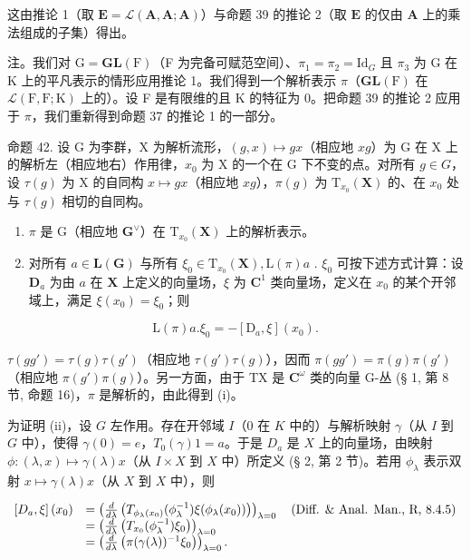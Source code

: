 这由推论 1（取 \(\mathbf{E} = \mathcal{L}(\mathbf{A},\mathbf{A};\mathbf{A})\)）与命题 39 的推论 2（取 \(\mathbf{E}\) 的仅由 \(\mathbf{A}\) 上的乘法组成的子集）得出。

注。我们对 \(\mathrm{G} = \mathbf{GL}(\mathrm{F})\)（F 为完备可赋范空间）、\(\pi_1 = \pi_2 = \mathrm{Id}_{G}\) 且 \(\pi_3\) 为 G 在 K 上的平凡表示的情形应用推论 1。我们得到一个解析表示 \(\pi\)（\(\mathbf{GL}(\mathrm{F})\) 在 \(\mathcal{L}(\mathrm{F},\mathrm{F};\mathrm{K})\) 上的）。设 F 是有限维的且 K 的特征为 0。把命题 39 的推论 2 应用于 \(\pi\)，我们重新得到命题 37 的推论 1 的一部分。

命题 42. 设 G 为李群，X 为解析流形，\((g,x)\mapsto gx\)（相应地 \(xg\)）为 G 在 X 上的解析左（相应地右）作用律，\(x_0\) 为 X 的一个在 G 下不变的点。对所有 \(g\in G\)，设 \(\tau (g)\) 为 X 的自同构 \(x\mapsto gx\)（相应地 \(xg\)），\(\pi (g)\) 为 \(\mathrm{T}_{x_0}(\mathbf{X})\) 的、在 \(x_0\) 处与 \(\tau (g)\) 相切的自同构。

\begin{enumerate}
\def\labelenumi{(\roman{enumi})}
\item
  \(\pi\) 是 G（相应地 \(\mathbf{G}^{\vee}\)）在 \(\mathrm{T}_{x_0}(\mathbf{X})\) 上的解析表示。
\item
  对所有 \(a \in \mathbf{L}(\mathbf{G})\) 与所有 \(\xi_0 \in \mathrm{T}_{x_0}(\mathbf{X}), \mathrm{L}(\pi)a\) . \(\xi_0\) 可按下述方式计算：设 \(\mathbf{D}_a\) 为由 \(a\) 在 \(\mathbf{X}\) 上定义的向量场，\(\xi\) 为 \(\mathbf{C}^1\) 类向量场，定义在 \(x_0\) 的某个开邻域上，满足 \(\xi(x_0) = \xi_0\)；则
\end{enumerate}

\[
\mathrm{L} (\pi) a. \xi_ {0} = - [ \mathrm{D} _ {a}, \xi ] (x _ {0}).
\]

\(\tau(gg') = \tau(g)\tau(g')\)（相应地 \(\tau(g')\tau(g)\)），因而 \(\pi(gg') = \pi(g)\pi(g')\)（相应地 \(\pi(g')\pi(g)\)）。另一方面，由于 TX 是 \(\mathbf{C}^{\omega}\) 类的向量 G-丛 (§ 1, 第 8 节, 命题 16)，\(\pi\) 是解析的，由此得到 (i)。

为证明 (ii)，设 \(G\) 左作用。存在开邻域 \(I\)（\(0\) 在 \(K\) 中的）与解析映射 \(\gamma\)（从 \(I\) 到 \(G\) 中），使得 \(\gamma(0) = e\)，\(T_0(\gamma)1 = a\)。于是 \(D_a\) 是 \(X\) 上的向量场，由映射 \(\phi: (\lambda, x) \mapsto \gamma(\lambda)x\)（从 \(I \times X\) 到 \(X\) 中）所定义 (§ 2, 第 2 节)。若用 \(\phi_{\lambda}\) 表示双射 \(x \mapsto \gamma(\lambda)x\)（从 \(X\) 到 \(X\) 中），则

\[
\begin{array}{r l} \left[ D _ {a}, \xi \right] (x _ {0}) & = \left(\frac {d}{d \lambda} \left(T _ {\phi_ {\lambda} (x _ {0})} (\phi_ {\lambda} ^ {- 1}) \xi (\phi_ {\lambda} (x _ {0}))\right)\right) _ {\lambda = 0} \quad \text {(Diff. \& Anal. Man., R, 8.4.5)} \\ & = \left(\frac {d}{d \lambda} \left(T _ {x _ {0}} (\phi_ {\lambda} ^ {- 1}) \xi_ {0}\right)\right) _ {\lambda = 0} \\ & = \left(\frac {d}{d \lambda} \left(\pi (\gamma (\lambda)) ^ {- 1} \xi_ {0}\right)\right) _ {\lambda = 0}. \end{array}
\]

